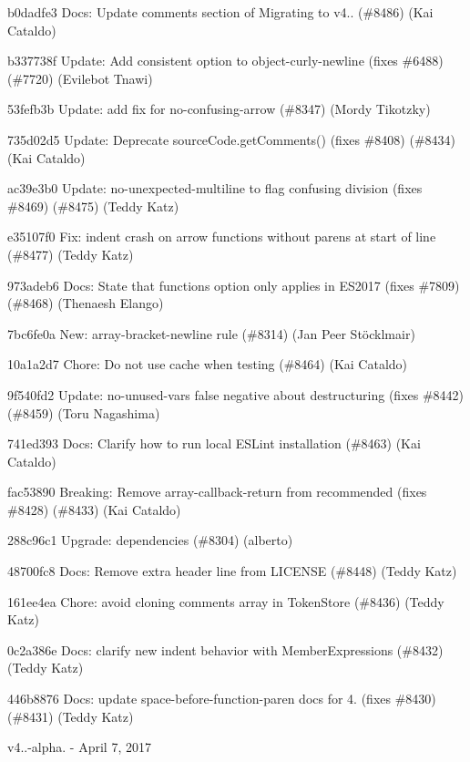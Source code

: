 \begin{DoxyItemize}
\item b0dadfe3 Docs\+: Update comments section of Migrating to v4.. (\#8486) (Kai Cataldo)
\item b337738f Update\+: Add {\ttfamily consistent} option to {\ttfamily object-\/curly-\/newline} (fixes \#6488) (\#7720) (Evilebot Tnawi)
\item 53fefb3b Update\+: add fix for no-\/confusing-\/arrow (\#8347) (Mordy Tikotzky)
\item 735d02d5 Update\+: Deprecate source\+Code.\+get\+Comments() (fixes \#8408) (\#8434) (Kai Cataldo)
\item ac39e3b0 Update\+: no-\/unexpected-\/multiline to flag confusing division (fixes \#8469) (\#8475) (Teddy Katz)
\item e35107f0 Fix\+: indent crash on arrow functions without parens at start of line (\#8477) (Teddy Katz)
\item 973adeb6 Docs\+: State that functions option only applies in E\+S2017 (fixes \#7809) (\#8468) (Thenaesh Elango)
\item 7bc6fe0a New\+: array-\/bracket-\/newline rule (\#8314) (Jan Peer Stöcklmair)
\item 10a1a2d7 Chore\+: Do not use cache when testing (\#8464) (Kai Cataldo)
\item 9f540fd2 Update\+: no-\/unused-\/vars false negative about destructuring (fixes \#8442) (\#8459) (Toru Nagashima)
\item 741ed393 Docs\+: Clarify how to run local E\+S\+Lint installation (\#8463) (Kai Cataldo)
\item fac53890 Breaking\+: Remove array-\/callback-\/return from recommended (fixes \#8428) (\#8433) (Kai Cataldo)
\item 288c96c1 Upgrade\+: dependencies (\#8304) (alberto)
\item 48700fc8 Docs\+: Remove extra header line from L\+I\+C\+E\+N\+SE (\#8448) (Teddy Katz)
\item 161ee4ea Chore\+: avoid cloning comments array in Token\+Store (\#8436) (Teddy Katz)
\item 0c2a386e Docs\+: clarify new indent behavior with Member\+Expressions (\#8432) (Teddy Katz)
\item 446b8876 Docs\+: update space-\/before-\/function-\/paren docs for 4. (fixes \#8430) (\#8431) (Teddy Katz)
\end{DoxyItemize}

v4..-\/alpha. -\/ April 7, 2017


